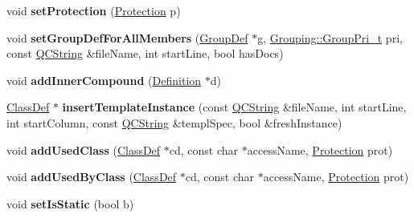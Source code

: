 \begin{DoxyCompactItemize}
\item 
\mbox{\label{class_class_def_afdba759f6a8bc7816b1bef2cc08c2c88}} 
void {\bfseries set\+Protection} (\mbox{\hyperlink{types_8h_a90e352184df58cd09455fe9996cd4ded}{Protection}} p)
\item 
\mbox{\label{class_class_def_a83670f6f0dec52283e80605190dec6af}} 
void {\bfseries set\+Group\+Def\+For\+All\+Members} (\mbox{\hyperlink{class_group_def}{Group\+Def}} $\ast$g, \mbox{\hyperlink{struct_grouping_a9f0ec5ab376b083ebe3274ea79fd2d70}{Grouping\+::\+Group\+Pri\+\_\+t}} pri, const \mbox{\hyperlink{class_q_c_string}{Q\+C\+String}} \&file\+Name, int start\+Line, bool has\+Docs)
\item 
\mbox{\label{class_class_def_a7b5a9498ef2334cb960e5d799942cb73}} 
void {\bfseries add\+Inner\+Compound} (\mbox{\hyperlink{class_definition}{Definition}} $\ast$d)
\item 
\mbox{\label{class_class_def_adcca2200b60cb35868a5f245011197c0}} 
\mbox{\hyperlink{class_class_def}{Class\+Def}} $\ast$ {\bfseries insert\+Template\+Instance} (const \mbox{\hyperlink{class_q_c_string}{Q\+C\+String}} \&file\+Name, int start\+Line, int start\+Column, const \mbox{\hyperlink{class_q_c_string}{Q\+C\+String}} \&templ\+Spec, bool \&fresh\+Instance)
\item 
\mbox{\label{class_class_def_a87934df4169779d1cede8616c88e46c8}} 
void {\bfseries add\+Used\+Class} (\mbox{\hyperlink{class_class_def}{Class\+Def}} $\ast$cd, const char $\ast$access\+Name, \mbox{\hyperlink{types_8h_a90e352184df58cd09455fe9996cd4ded}{Protection}} prot)
\item 
\mbox{\label{class_class_def_ab9d0b0dea11daab4844e904e655c3641}} 
void {\bfseries add\+Used\+By\+Class} (\mbox{\hyperlink{class_class_def}{Class\+Def}} $\ast$cd, const char $\ast$access\+Name, \mbox{\hyperlink{types_8h_a90e352184df58cd09455fe9996cd4ded}{Protection}} prot)
\item 
\mbox{\label{class_class_def_a012459afa4539eddb883b85fc6e69412}} 
void {\bfseries set\+Is\+Static} (bool b)
\item 
\mbox{\label{class_class_def_aca66bd4014d836ccd64b0d39aab23249}} 

\end{DoxyCompactItemize}
